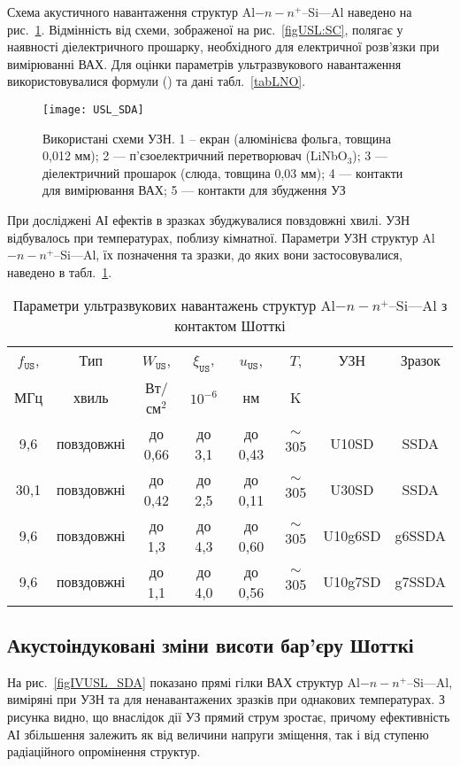 Схема акустичного навантаження структур Al$-n-n^+$--Si---Al наведено на рис.~\ref{figUSL:SDA}.
Відмінність від схеми, зображеної на рис.~\ref{figUSL:SC}, полягає у наявності діелектричного прошарку,
необхідного для електричної розв'язки при вимірюванні ВАХ.
Для оцінки параметрів ультразвукового навантаження використовувалися формули () та дані табл.~\ref{tabLNO}.

\begin{figure}%
\center
\texttt{[image: USL\_SDA]}%
\caption{\label{figUSL:SDA}
Використані схеми УЗН.
1 --  екран (алюмінієва фольга, товщина 0,012 мм);
2 --- п'єзоелектричний перетворювач (LiNbO$_3$);
3 --- діелектричний прошарок (слюда, товщина 0,03 мм);
4 --- контакти для вимірювання ВАХ;
5 --- контакти для збудження УЗ
}
\end{figure}



При досліджені АІ ефектів в зразках збуджувалися повздовжні хвилі.
УЗН відбувалось при температурах, поблизу кімнатної.
Параметри УЗН структур Al$-n-n^+$--Si---Al, їх позначення та зразки, до яких вони застосовувалися, наведено в табл.~\ref{tabUSL:SD}.

\begin{table}
\caption{\label{tabUSL:SD}Параметри ультразвукових навантажень структур Al$-n-n^+$--Si---Al з контактом Шотткі
}
\center
\begin{tabular}{|c|c|c|c|c|c|c|c|}
\hline
$f_\mathtt{US}$,&Тип&$W_{\mathtt{US}}$,&$\xi_{\mathtt{US}}$,&$u_{\mathtt{US}}$,&$T$,&УЗН&Зразок\\
МГц&хвиль&Вт/см$^2$&$10^{-6}$&нм&K&&\\
\hline
9,6&повздовжні&до 0,66&до 3,1&до 0,43&$\sim$305&U10SD&SSDA\\ \hline
30,1&повздовжні&до 0,42&до 2,5&до 0,11&$\sim$305&U30SD&SSDA\\ \hline
9,6&повздовжні&до 1,3&до 4,3&до 0,60&$\sim$305&U10g6SD&g6SSDA\\ \hline
9,6&повздовжні&до 1,1&до 4,0&до 0,56&$\sim$305&U10g7SD&g7SSDA\\ \hline
\end{tabular}
\end{table}


\subsection{Акустоіндуковані зміни висоти бар'єру Шотткі}

На рис.~\ref{figIVUSL_SDA} показано прямі гілки ВАХ структур Al$-n-n^+$--Si---Al, виміряні при УЗН та для ненавантажених
зразків при однакових температурах.
З рисунка видно, що внаслідок дії УЗ прямий струм зростає, причому
ефективність АІ збільшення залежить як від величини напруги зміщення, так і від ступеню радіаційного опромінення структур.

